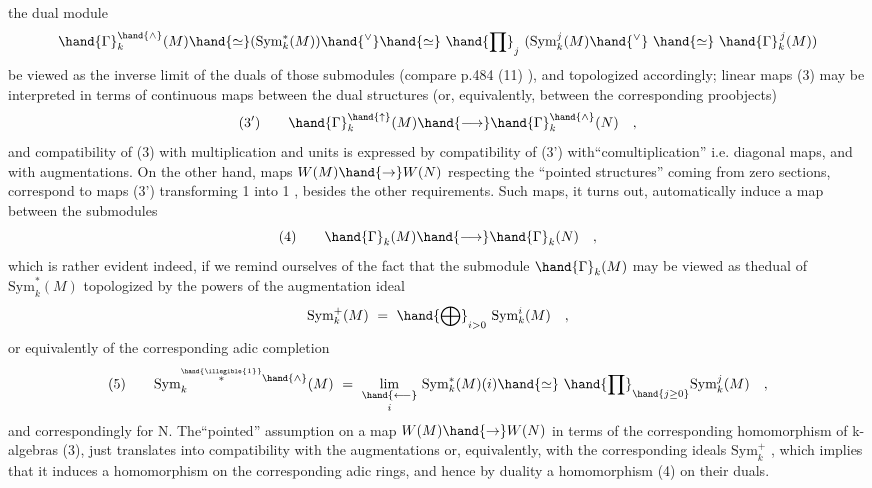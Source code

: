 
the dual module
\[\hand{\Gamma}_k^{\hand{\wedge}}(M)\hand{\simeq}(\mathrm{Sym}_k^{*}(M))\hand{^{\vee}}\hand{\simeq}\ \hand{\prod}_j\ (\mathrm{Sym}_k^{j}(M)\hand{^{\vee}}\ \hand{\simeq}\ \hand{\Gamma}_k^{\,j}(M))\]
 be viewed as the inverse limit of the duals of those submodules
(compare p.484 (11) ), and topologized accordingly; linear maps (3)
may be interpreted in terms of continuous maps between the dual structures
(or, equivalently, between the corresponding proobjects)
\[(3')\qquad \hand{\Gamma}_k^{\hand{\uparrow}}(M)\hand{\longrightarrow}\hand{\Gamma}_k^{\hand{\wedge}}(N)\quad ,\]
and compatibility of (3) with multiplication and units is expressed by
compatibility of (3') with``comultiplication'' i.e. diagonal maps, and
with augmentations. On the other hand, maps $W(M)\hand{\rightarrow} W(N)$ respecting the
``pointed structures'' coming from zero sections, correspond to maps (3')
transforming 1 into 1 , besides the other requirements. Such maps,
it turns out, automatically  induce a map between the submodules
\[(4)\qquad \hand{\Gamma}_k(M)\hand{\longrightarrow}\hand{\Gamma}_k(N)\quad ,\]
which is rather evident indeed, if we  remind ourselves of 
the fact that the submodule $\hand{\Gamma}_k(M)$ may be viewed as thedual of $\mathrm{Sym}_k^{*}(M)$\hand{,}
topologized by the powers of the augmentation ideal 
\[\mathrm{Sym}_k^{+}(M)\ =\ \hand{\bigoplus}_{i>0}\ \mathrm{Sym}_k^{i}(M)\quad ,\]
or equivalently of the corresponding adic completion
\[(5)\qquad \mathrm{Sym}_k^{\overset{\hand{\illegible{1}}}{*}\hand{\wedge}}(M)\ =\ \underset{i}{\underset{\hand{\longleftarrow}}{\mathrm{lim}}}\ \mathrm{Sym}_k^{*}(M)(i)\hand{\simeq}\ \hand{\prod}_{\hand{j\geq 0}}\mathrm{Sym}_k^{j}(M)\quad ,\]
and correspondingly for N. The``pointed'' assumption on  a map $W(M)\hand{\rightarrow}W(N)$\hand{,}
in terms of the corresponding homomorphism of k-algebras (3), just
translates into compatibility with the augmentations or, equivalently,
with the corresponding ideals $\mathrm{Sym}_k^{+}$ , which implies that it induces a
homomorphism on the corresponding adic rings, and hence by duality a
homomorphism (4) on their duals.

